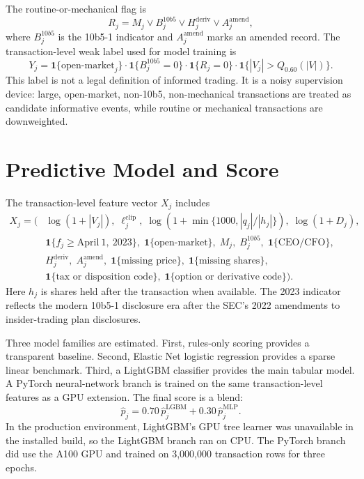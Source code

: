 \documentclass[11pt]{article}
\newcommand{\one}{\mathbf{1}}
\begin{document}
The routine-or-mechanical flag is
\begin{equation}
R_j = M_j \vee B^{10b5}_j \vee H^{\mathrm{deriv}}_j \vee A^{\mathrm{amend}}_j,
\end{equation}
where $B^{10b5}_j$ is the 10b5-1 indicator and $A^{\mathrm{amend}}_j$ marks an
amended record. The transaction-level weak label used for model training is
\begin{equation}
Y_j =
\one\{\text{open-market}_j\}
\cdot
\one\{B^{10b5}_j=0\}
\cdot
\one\{R_j=0\}
\cdot
\one\{|V_j|>Q_{0.60}(|V|)\}.
\end{equation}
This label is not a legal definition of informed trading. It is a noisy
supervision device: large, open-market, non-10b5, non-mechanical transactions
are treated as candidate informative events, while routine or mechanical
transactions are downweighted.

\section{Predictive Model and Score}

The transaction-level feature vector $X_j$ includes
\begin{align}
X_j = (&\log(1+|V_j|),\; \ell^{\mathrm{clip}}_j,\;
\log(1+\min\{1000, |q_j|/|h_j|\}),\; \log(1+D_j),\\
&\one\{f_j \geq \mathrm{April\ 1,\ 2023}\},\;
\one\{\text{open-market}\},\; M_j,\; B^{10b5}_j,\;
\one\{\text{CEO/CFO}\},\\
&H^{\mathrm{deriv}}_j,\; A^{\mathrm{amend}}_j,\;
\one\{\text{missing price}\},\; \one\{\text{missing shares}\},\\
&\one\{\text{tax or disposition code}\},\;
\one\{\text{option or derivative code}\}).
\end{align}
Here $h_j$ is shares held after the transaction when available. The 2023
indicator reflects the modern 10b5-1 disclosure era after the SEC's 2022
amendments to insider-trading plan disclosures.

Three model families are estimated. First, rules-only scoring provides a
transparent baseline. Second, Elastic Net logistic regression provides a sparse
linear benchmark. Third, a LightGBM classifier provides the main tabular model.
A PyTorch neural-network branch is trained on the same transaction-level
features as a GPU extension. The final score is a blend:
\begin{equation}
\widehat{p}_j =
0.70\,\widehat{p}^{\mathrm{LGBM}}_j
+0.30\,\widehat{p}^{\mathrm{MLP}}_j.
\end{equation}
In the production environment, LightGBM's GPU tree learner was unavailable in
the installed build, so the LightGBM branch ran on CPU. The PyTorch branch did
use the A100 GPU and trained on 3,000,000 transaction rows for three epochs.
\end{document}
